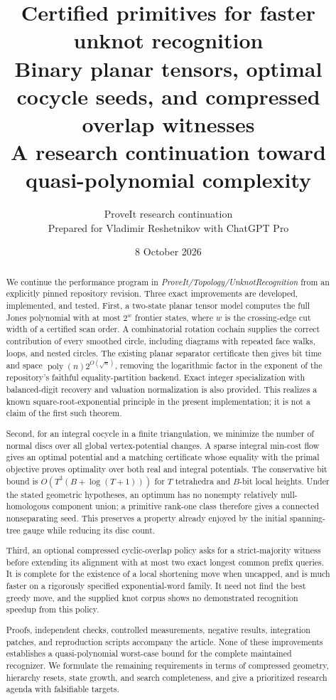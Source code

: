 \documentclass[11pt,a4paper]{article}
\title{\color{ink}\bfseries Certified primitives for faster\\unknot recognition\\[7pt]
 \large Binary planar tensors, optimal cocycle seeds, and compressed overlap witnesses\\[5pt]
 \normalsize A research continuation toward quasi-polynomial complexity}
\author{ProveIt research continuation\\\small Prepared for Vladimir Reshetnikov with ChatGPT Pro}
\date{8 October 2026}
\theoremstyle{definition}
\theoremstyle{remark}
\newcommand{\poly}{\operatorname{poly}}
\begin{document}
\maketitle
\begin{abstract}
We continue the performance program in \emph{ProveIt/Topology/UnknotRecognition}
from an explicitly pinned repository revision. Three exact improvements are
developed, implemented, and tested. First, a two-state planar tensor model
computes the full Jones polynomial with at most $2^w$ frontier states, where
$w$ is the crossing-edge cut width of a certified scan order. A combinatorial
rotation cochain supplies the correct contribution of every smoothed circle,
including diagrams with repeated face walks, loops, and nested circles.
The existing planar separator certificate then gives bit time and space
$\poly(n)2^{O(\sqrt n)}$, removing the logarithmic factor in the exponent
of the repository's faithful equality-partition backend. Exact integer
specialization with balanced-digit recovery and valuation normalization is
also provided. This realizes a known square-root-exponential principle in
the present implementation; it is not a claim of the first such theorem.

Second, for an integral cocycle in a finite triangulation, we minimize the
number of normal discs over all global vertex-potential changes. A sparse
integral min-cost flow gives an optimal potential and a matching certificate
whose equality with the primal objective proves optimality over both real
and integral potentials. The conservative bit bound is
$O(T^3(B+\log(T+1)))$ for $T$ tetrahedra and $B$-bit local heights. Under the
stated geometric hypotheses, an optimum has no nonempty relatively
null-homologous component union; a primitive rank-one class therefore gives
a connected nonseparating seed. This preserves a property already enjoyed by
the initial spanning-tree gauge while reducing its disc count.

Third, an optional compressed cyclic-overlap policy asks for a strict-majority
witness before extending its alignment with at most two exact longest common
prefix queries. It is complete for the existence of a local shortening move
when uncapped, and is much faster on a rigorously specified exponential-word
family. It need not find the best greedy move, and the supplied knot corpus
shows no demonstrated recognition speedup from this policy.

Proofs, independent checks, controlled measurements, negative results,
integration patches, and reproduction scripts accompany the article. None of
these improvements establishes a quasi-polynomial worst-case bound for the
complete maintained recognizer. We formulate the remaining requirements in
terms of compressed geometry, hierarchy resets, state growth, and search
completeness, and give a prioritized research agenda with falsifiable targets.
\end{abstract}
\end{document}
